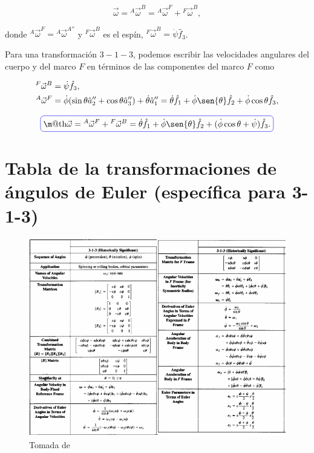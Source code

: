 \documentclass[a4paper,10pt]{article}
\makeatletter
\numberwithin{equation}{section}
\newcommand*{\boxcolor}{blue}
\renewcommand{\boxed}[1]{\textcolor{\boxcolor}{%
\tikz[baseline={([yshift=-1ex]current bounding box.center)}] \node [rectangle, minimum width=1ex,rounded corners,draw] {\normalcolor\m@th$\displaystyle#1$};}}
\makeatother
\begin{document}
\begin{equation}
 \vec{\omega} =  {^A}{ \vec{\omega}}^{B} =  {^A}{ \vec{\omega}}^{F} + 
  {^F}{ \vec{\omega}}^{B},
  \label{eq:velAngFframe2}
\end{equation}

donde ${^A}{ \vec{\omega}}^{F} = {^A}{ \vec{\omega}}^{A''}$ y ${^F}{ \vec{\omega}}^{B}$ 
es el espín, ${^F}{ \vec{\omega}}^{B} = \dot{\psi}\hat{f}_3$. 

\vspace{.3cm}

Para una transformación $3-1-3$, podemos escribir las velocidades angulares del cuerpo 
y del marco $F$ en términos de las componentes del marco $F$ como

\begin{align}
\begin{split}
 {^F}{ \vec{\omega}}^{B} &= \dot{\psi}\hat{f}_3, \\
 {^A}{ \vec{\omega}}^{F} &= \dot{\phi}(\sin{\theta}\hat{a}''_2 + \cos{\theta}\hat{a}''_3) 
 + \dot{\theta}\hat{a}''_1 = \dot{\theta}\hat{f}_1 + \dot{\phi}\sen{\theta}\hat{f}_2 +
 \dot{\phi}\cos{\theta}\hat{f}_3,
\end{split}
\end{align}

\begin{equation}
 \boxed{\vec{\omega} = {^A}{ \vec{\omega}}^{F} + {^F}{ \vec{\omega}}^{B} = \dot{\theta}\hat{f}_1 
 + \dot{\phi}\sen{\theta}\hat{f}_2 + (\dot{\phi}\cos{\theta} + \dot{\psi})\hat{f}_3.}
\label{eq:velAngFframe3}
\end{equation}

\newpage

\section{Tabla de la transformaciones de ángulos de Euler (específica para 3-1-3)}

\begin{figure}[H]
 \center
 \includegraphics[scale=0.55]{apendice4fig1}
 \caption{Tomada de \cite{baruh}}
 \label{fig:apendice4fig1}
\end{figure}
\end{document}
